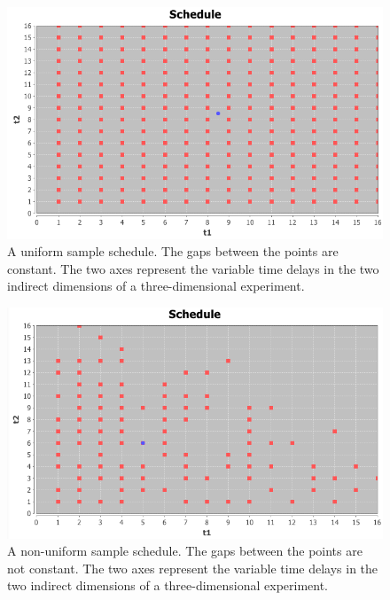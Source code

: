 \begin{figure}
  \includegraphics[scale=0.5]{figures/schedule_uniform}
  \caption[A uniform sample schedule]
          {A uniform sample schedule.  The gaps between the points
           are constant.  The two axes represent the 
           variable time delays in the two indirect dimensions of a
           three-dimensional experiment.}
  \label{schedule_uniform}
\end{figure}

\begin{figure}
  \includegraphics[scale=0.5]{figures/schedule_nonuniform}
  \caption[A non-uniform sample schedule]
          {A non-uniform sample schedule.  The gaps between the points
           are not constant.  The two axes represent the 
           variable time delays in the two indirect dimensions of a
           three-dimensional experiment.}
  \label{schedule_nonuniform}
\end{figure}

